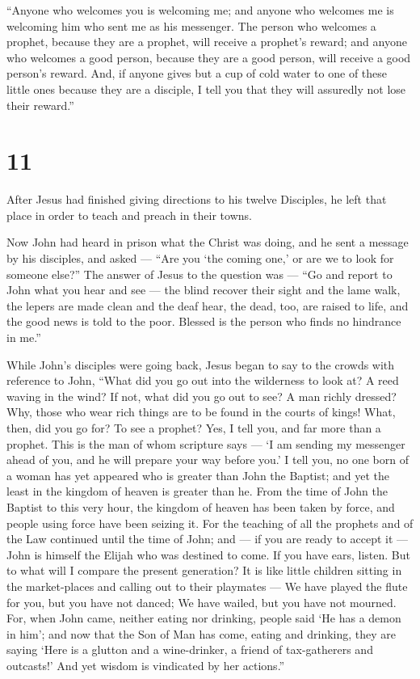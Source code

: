  ``Anyone who welcomes you is welcoming me; and anyone who
welcomes me is welcoming him who sent me as his messenger. 
The person who welcomes a prophet, because they are a prophet, will
receive a prophet's reward; and anyone who welcomes a good person,
because they are a good person, will receive a good person's reward.
 And, if anyone gives but a cup of cold water to one of
these little ones because they are a disciple, I tell you that they will
assuredly not lose their reward.''

\hypertarget{section-10}{%
\section{11}\label{section-10}}

 After Jesus had finished giving directions to his twelve
Disciples, he left that place in order to teach and preach in their
towns.

 Now John had heard in prison what the Christ was doing, and
he sent a message by his disciples,  and asked --- ``Are you
`the coming one,' or are we to look for someone else?''  The
answer of Jesus to the question was --- ``Go and report to John what you
hear and see ---  the blind recover their sight and the lame
walk, the lepers are made clean and the deaf hear, the dead, too, are
raised to life, and the good news is told to the poor. 
Blessed is the person who finds no hindrance in me.''

 While John's disciples were going back, Jesus began to say
to the crowds with reference to John,  ``What did you go out
into the wilderness to look at? A reed waving in the wind? If not, what
did you go out to see? A man richly dressed? Why, those who wear rich
things are to be found in the courts of kings!  What, then,
did you go for? To see a prophet? Yes, I tell you, and far more than a
prophet.  This is the man of whom scripture says --- `I am
sending my messenger ahead of you, and he will prepare your way before
you.'  I tell you, no one born of a woman has yet appeared
who is greater than John the Baptist; and yet the least in the kingdom
of heaven is greater than he.  From the time of John the
Baptist to this very hour, the kingdom of heaven has been taken by
force, and people using force have been seizing it.  For
the teaching of all the prophets and of the Law continued until the time
of John;  and --- if you are ready to accept it --- John is
himself the Elijah who was destined to come.  If you have
ears, listen.  But to what will I compare the present
generation? It is like little children sitting in the market-places and
calling out to their playmates ---  We have played the
flute for you, but you have not danced; We have wailed, but you have not
mourned.  For, when John came, neither eating nor drinking,
people said `He has a demon in him';  and now that the Son
of Man has come, eating and drinking, they are saying `Here is a glutton
and a wine-drinker, a friend of tax-gatherers and outcasts!' And yet
wisdom is vindicated by her actions.''

